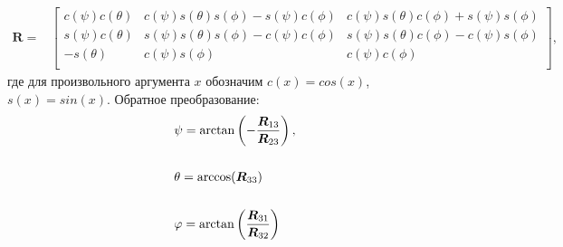 \small
\begin{equation*} \label{eq:eul_to_rotmx}
\begin{aligned}
\bm{R} =
&\begin{bmatrix}
c(\psi)c(\theta) & c(\psi)s(\theta)s(\phi) - s(\psi)c(\phi) & c(\psi)s(\theta)c(\phi) + s(\psi)s(\phi) \\
s(\psi)c(\theta) & s(\psi)s(\theta)s(\phi) - c(\psi)c(\phi) & s(\psi)s(\theta)c(\phi) - c(\psi)s(\phi) \\
-s(\theta)         & c(\psi)s(\phi)                                 & c(\psi)c(\phi)\\
\end{bmatrix},
\end{aligned}
\end{equation*}
\normalsize
где для произвольного аргумента $x$ обозначим $c(x) = cos(x)$, $s(x) = sin(x)$. Обратное преобразование:
\begin{equation} \label{eq:rotmx_to_eul}
\begin{aligned}
&\psi  = \arctan\left( { - \frac{{{{\bm{R}}_{13}}}}{{{{\bm{R}}_{23}}}}} \right),
\\
\vspace{3mm}
\\
&{\theta  = \arccos  ({{{\bm{R}}_{33}}} )}
\\
\vspace{3mm}
\\
&\varphi  = \arctan\left( {\frac{{{{\bm{R}}_{31}}}}{{{{\bm{R}}_{32}}}}} \right)
\end{aligned}
\end{equation}


